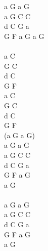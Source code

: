 \documentclass[a5paper, 10pt]{book}
\begin{document}
\begin{minipage}[t]{0.2\textwidth}
a G a G\\
a G C C\\
d C G a\\
G F a G a G\\
\\
a C\\
G C\\
d C\\
G F\\
a C\\
G C\\
d C\\
G F\\
(a G a G)\\

a G a G\\
a G C C\\
d C G a\\
G F a G\\
a G\\
~\\
a G a G\\
a G C C\\
d C G a\\
G F a G\\
a G\\
\end{minipage}

\newpage
\end{document}
